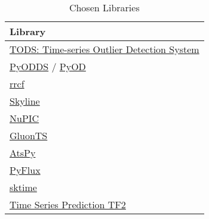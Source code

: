 \begin{table}[h]\centering
        \begin{tabular}{l}
            Library                                                                                                 \\\midrule
            \href{https://github.com/datamllab/tods}{TODS: Time-series Outlier Detection System}                    \\\addlinespace
            \href{https://github.com/datamllab/pyodds}{PyODDS} / \href{https://github.com/yzhao062/pyod}{PyOD}      \\\addlinespace
            \href{https://github.com/kLabUM/rrcf}{rrcf}                                                             \\\addlinespace
            \href{https://github.com/earthgecko/skyline}{Skyline}                                                   \\\addlinespace
            \href{https://github.com/numenta/nupic}{NuPIC}                                                          \\\addlinespace
            
            \href{https://github.com/awslabs/gluon-ts}{GluonTS}                                                     \\\addlinespace
            \href{https://github.com/firmai/atspy}{AtsPy}                                                           \\\addlinespace
            \href{https://github.com/RJT1990/pyflux}{PyFlux}                                                        \\\addlinespace
            \href{https://github.com/alan-turing-institute/sktime}{sktime}                                          \\\addlinespace
            \href{https://github.com/LongxingTan/Time-series-prediction}{Time Series Prediction TF2}                \\
        \end{tabular}
    \caption{Chosen Libraries}\label{tab:chosen-packages}
\end{table}




